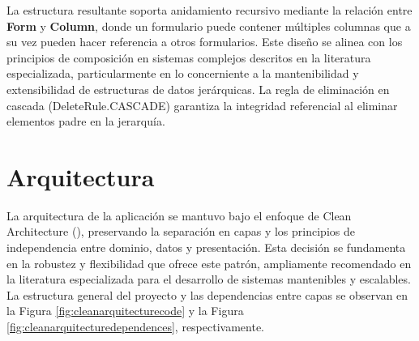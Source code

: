 \documentclass[12pt, a4paper]{book}
\begin{document}
La estructura resultante soporta anidamiento recursivo mediante la relación entre \textbf{Form} y \textbf{Column}, donde un formulario puede contener múltiples columnas que a su vez pueden hacer referencia a otros formularios. Este diseño se alinea con los principios de composición en sistemas complejos descritos en la literatura especializada, particularmente en lo concerniente a la mantenibilidad y extensibilidad de estructuras de datos jerárquicas. La regla de eliminación en cascada (DeleteRule.CASCADE) garantiza la integridad referencial al eliminar elementos padre en la jerarquía.

\section{Arquitectura}

La arquitectura de la aplicación se mantuvo bajo el enfoque de Clean Architecture (\cite{martin2017}), preservando la separación en capas y los principios de independencia entre dominio, datos y presentación. Esta decisión se fundamenta en la robustez y flexibilidad que ofrece este patrón, ampliamente recomendado en la literatura especializada para el desarrollo de sistemas mantenibles y escalables. La estructura general del proyecto y las dependencias entre capas se observan en la Figura \ref{fig:cleanarquitecturecode} y la Figura \ref{fig:cleanarquitecturedependences}, respectivamente.
\end{document}
